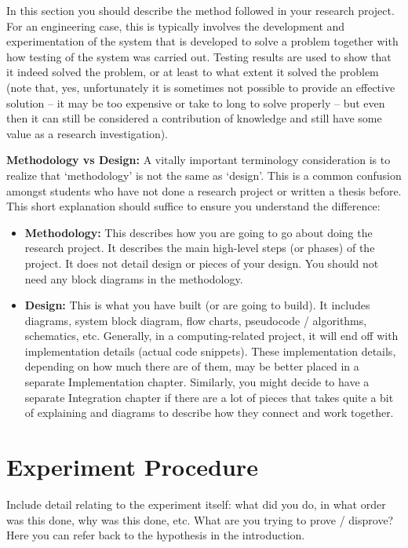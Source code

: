 \label{Ch:Methodology}

In this section you should describe the method followed in your research project.  For an engineering case, this is typically involves the development and experimentation of the system that is developed to solve a problem together with how testing of the system was carried out.  Testing results are used to show that it indeed solved the problem, or at least to what extent it solved the problem (note that, yes, unfortunately it is sometimes not possible to provide an effective solution -- it may be too expensive or take to long to solve properly -- but even then it can still be considered a contribution of knowledge and still have some value as a research investigation).

\textbf{Methodology vs Design:} A vitally important terminology consideration is to realize that `methodology' is not the same as `design'.  This is a common confusion amongst students who have not done a research project or written a thesis before. This short explanation should suffice to ensure you understand the difference:

\begin{itemize}
  \item \textbf{Methodology:} This describes how you are going to go about doing the research project. It describes the main high-level steps (or phases) of the project. It does not detail design or pieces of your design. You should not need any block diagrams in the methodology.
  \item \textbf{Design:} This is what you have built (or are going to build). It includes diagrams, system block diagram, flow charts, pseudocode / algorithms, schematics, etc.  Generally, in a computing-related project, it will end off with implementation details (actual code snippets).  These implementation details, depending on how much there are of them, may be better placed in a separate Implementation chapter.  Similarly, you might decide to have a separate Integration chapter if there are a lot of pieces that takes quite a bit of explaining and diagrams to describe how they connect and work together. 
\end{itemize}

\section{Experiment Procedure}

Include detail relating to the experiment itself: what did you do, in what order was this done, why was this done, etc.  What are you trying to prove / disprove?  Here you can refer back to the hypothesis in the introduction.
